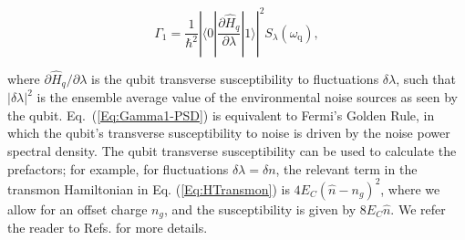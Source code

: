 \documentclass[aip,apr,twocolumn,showpacs,superscriptaddress,groupedaddress,nofootinbib,reprint]{revtex4-1}  %
\newcommand{\freq}{\omega_\text{q}}
\renewcommand{\d}{\text{d}}
\begin{document}
\begin{equation}
\Gamma_{1} = \frac{1}{\hbar^2} \left| \langle 0 | \frac{\partial \hat{H}_q}{\partial\lambda} | 1 \rangle \right|^2 S_{\lambda} (\freq),
\label{Eq:Gamma1-PSD}
\end{equation}

\noindent where $\partial\hat{H}_q / \partial\lambda$ is the qubit transverse susceptibility to fluctuations $\delta \lambda$, such that $|\delta \lambda|^2$ %
is the ensemble average value of the environmental noise sources as seen by the qubit.
%
%
%
Eq.~(\ref{Eq:Gamma1-PSD}) is equivalent to Fermi's Golden Rule,
in which the qubit's transverse susceptibility to noise %
is driven by the noise power spectral density.
%
%
The qubit transverse susceptibility can be used to calculate the prefactors; for example, for fluctuations $\delta \lambda = \delta n$, the relevant term in the transmon Hamiltonian in Eq. (\ref{Eq:HTransmon}) is $4E_C(\hat{n} - n_g)^2$, where we allow for an offset charge $n_g$, and the susceptibility is given by $8 E_C\hat{n}$.
We refer the reader to Refs.  for more details.
\end{document}
